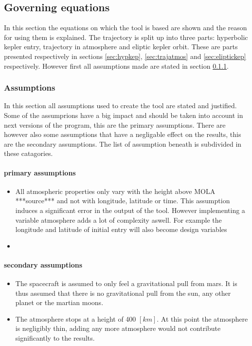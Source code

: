 \subsection{Governing equations}
\label{sec:astrogov}
In this section the equations on which the tool is based are shown and the reason for using them is explained. The trajectory is split up into three parts: hyperbolic kepler entry, trajectory in atmosphere and eliptic kepler orbit. These are parts presented respectively in sections \ref{sec:hypkep}, \ref{sec:trajatmos} and \ref{sec:eliptickep} respectively. However first all assumptions made are stated in section \ref{sec:astroassumption}.

\subsubsection{Assumptions}
 \label{sec:astroassumption}
 In this section all assumptions used to create the tool are stated and justified. Some of the assumprions have a big impact and should be taken into account in next versions of the program, this are the primary assumptions. There are however also some assumptions that have a negligable effect on the results, this are the secondary assumptions. The list of assumption beneath is subdivided in these catagories.
 
 \paragraph{primary assumptions}
 \begin{itemize}
 \item All atmospheric properties only vary with the height above MOLA ***source*** and not with longitude, latitude or time. This assumption induces a significant error in the output of the tool. However implementing a variable atmosphere adds a lot of complexity aswell. For example the longitude and latitude of initial entry will also become design variables
 \item 
 \end{itemize}
 
 
 \paragraph{secondary assumptions}
 \begin{itemize}
 \item The spacecraft is assumed to only feel a gravitational pull from mars. It is thus assumed that there is no gravitational pull from the sun, any other planet or the martian moons.
 \item The atmosphere stops at a height of 400 $\left[km\right]$. At this point the atmosphere is negligibly thin, adding any more atmosphere would not contribute significantly to the results.
 \end{itemize}
 
